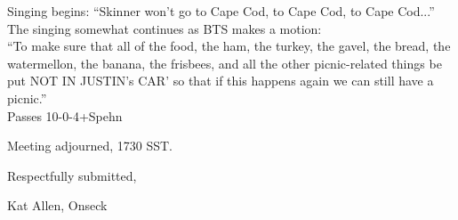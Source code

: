 \documentclass[10pt]{article}
\begin{document}
Singing begins: ``Skinner won't go to Cape Cod, to Cape Cod, to Cape
Cod...''\\
The singing somewhat continues as BTS makes a motion: \\
``To make sure that all of the food, the ham, the turkey, the gavel,
the bread, the watermellon, the banana, the frisbees, and all the
other picnic-related things be put NOT IN JUSTIN's CAR' so that if
this happens again we can still have a picnic.''\\
Passes 10-0-4+Spehn
\vspace{12pt}

\noindent
Meeting adjourned, 1730 SST.

\vspace{18pt}

\centerline{Respectfully submitted,}
\centerline{Kat Allen,  Onseck}
\end{document}
